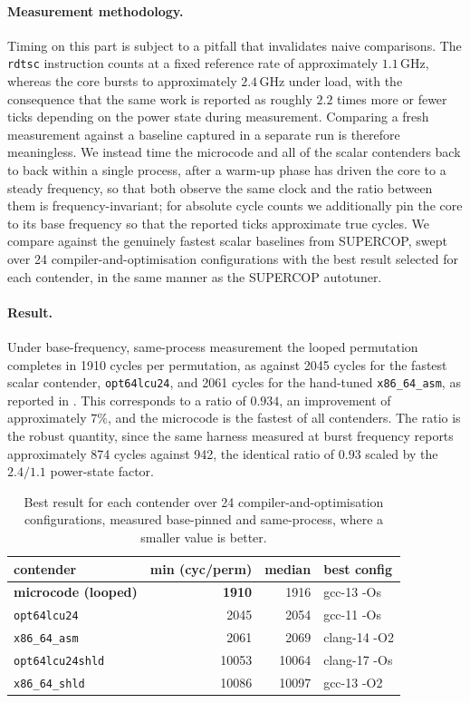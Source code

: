 \paragraph{Measurement methodology.}
Timing on this part is subject to a pitfall that invalidates naive comparisons.
The \texttt{rdtsc} instruction counts at a fixed reference rate of approximately
$1.1$\,GHz, whereas the core bursts to approximately $2.4$\,GHz under load, with
the consequence that the same work is reported as roughly $2.2$ times more or
fewer ticks depending on the power state during measurement. Comparing a fresh
measurement against a baseline captured in a separate run is therefore
meaningless. We instead time the microcode and all of the scalar contenders back
to back within a single process, after a warm-up phase has driven the core to a
steady frequency, so that both observe the same clock and the ratio between them
is frequency-invariant; for absolute cycle counts we additionally pin the core
to its base frequency so that the reported ticks approximate true cycles. We
compare against the genuinely fastest scalar baselines from SUPERCOP, swept over
24 compiler-and-optimisation configurations with the best result selected for
each contender, in the same manner as the SUPERCOP autotuner.

\paragraph{Result.}
Under base-frequency, same-process measurement the looped permutation completes
in 1910 cycles per permutation, as against 2045 cycles for the fastest scalar
contender, \texttt{opt64lcu24}, and 2061 cycles for the hand-tuned
\texttt{x86\_64\_asm}, as reported in . This
corresponds to a ratio of $0.934$, an improvement of approximately $7\%$, and
the microcode is the fastest of all contenders. The ratio is the robust
quantity, since the same harness measured at burst frequency reports
approximately 874 cycles against 942, the identical ratio of $0.93$ scaled by
the $2.4/1.1$ power-state factor.

\begin{table}[t]
\centering
\caption{Best result for each contender over 24
compiler-and-optimisation configurations, measured base-pinned and
same-process, where a smaller value is better.}
\label{tab:keccak-results}
\small
\begin{tabular}{@{}lrrl@{}}
\toprule
contender & min (cyc/perm) & median & best config \\
\midrule
\textbf{microcode (looped)}      & \textbf{1910} & 1916  & gcc-13 -Os \\
\texttt{opt64lcu24}              & 2045          & 2054  & gcc-11 -Os \\
\texttt{x86\_64\_asm}            & 2061          & 2069  & clang-14 -O2 \\
\texttt{opt64lcu24shld}          & 10053         & 10064 & clang-17 -Os \\
\texttt{x86\_64\_shld}           & 10086         & 10097 & gcc-13 -O2 \\
\bottomrule
\end{tabular}
\end{table}

